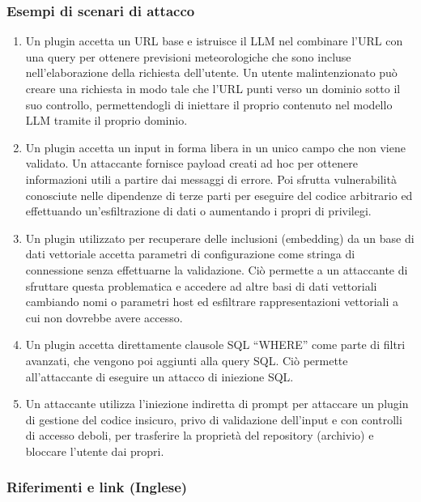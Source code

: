 \documentclass[
]{article}
\providecommand{\tightlist}{%
  \setlength{\itemsep}{0pt}\setlength{\parskip}{0pt}}
\begin{document}
\subsubsection{Esempi di scenari di
attacco}\label{esempi-di-scenari-di-attacco}

\begin{enumerate}
\def\labelenumi{\arabic{enumi}.}
\tightlist
\item
  Un plugin accetta un URL base e istruisce il LLM nel combinare l'URL
  con una query per ottenere previsioni meteorologiche che sono incluse
  nell'elaborazione della richiesta dell'utente. Un utente
  malintenzionato può creare una richiesta in modo tale che l'URL punti
  verso un dominio sotto il suo controllo, permettendogli di iniettare
  il proprio contenuto nel modello LLM tramite il proprio dominio.
\item
  Un plugin accetta un input in forma libera in un unico campo che non
  viene validato. Un attaccante fornisce payload creati ad hoc per
  ottenere informazioni utili a partire dai messaggi di errore. Poi
  sfrutta vulnerabilità conosciute nelle dipendenze di terze parti per
  eseguire del codice arbitrario ed effettuando un'esfiltrazione di dati
  o aumentando i propri di privilegi.
\item
  Un plugin utilizzato per recuperare delle inclusioni (embedding) da un
  base di dati vettoriale accetta parametri di configurazione come
  stringa di connessione senza effettuarne la validazione. Ciò permette
  a un attaccante di sfruttare questa problematica e accedere ad altre
  basi di dati vettoriali cambiando nomi o parametri host ed esfiltrare
  rappresentazioni vettoriali a cui non dovrebbe avere accesso.
\item
  Un plugin accetta direttamente clausole SQL ``WHERE'' come parte di
  filtri avanzati, che vengono poi aggiunti alla query SQL. Ciò permette
  all'attaccante di eseguire un attacco di iniezione SQL.
\item
  Un attaccante utilizza l'iniezione indiretta di prompt per attaccare
  un plugin di gestione del codice insicuro, privo di validazione
  dell'input e con controlli di accesso deboli, per trasferire la
  proprietà del repository (archivio) e bloccare l'utente dai propri.
\end{enumerate}

\subsubsection{Riferimenti e link
(Inglese)}\label{riferimenti-e-link-inglese}
\end{document}
